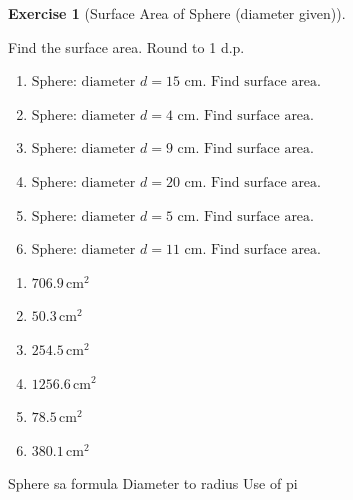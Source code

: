 \documentclass[
  letterpaper,
  DIV=11,
  numbers=noendperiod]{scrreprt}
\theoremstyle{definition}
\newtheorem{exercise}{Exercise}[chapter]
\theoremstyle{remark}
\begin{document}
\begin{exercise}[Surface Area of Sphere (diameter
given)]\protect\hypertarget{exr-cur-12}{}\label{exr-cur-12}

Find the surface area. Round to 1 d.p.

\begin{enumerate}
\def\labelenumi{\alph{enumi})}
\item
  \(\text{Sphere: diameter }d=15\text{ cm. Find surface area.}\)
\item
  \(\text{Sphere: diameter }d=4\text{ cm. Find surface area.}\)
\item
  \(\text{Sphere: diameter }d=9\text{ cm. Find surface area.}\)
\item
  \(\text{Sphere: diameter }d=20\text{ cm. Find surface area.}\)
\item
  \(\text{Sphere: diameter }d=5\text{ cm. Find surface area.}\)
\item
  \(\text{Sphere: diameter }d=11\text{ cm. Find surface area.}\)
\end{enumerate}

\begin{tcolorbox}[enhanced jigsaw, opacitybacktitle=0.6, coltitle=black, arc=.35mm, colframe=quarto-callout-tip-color-frame, colback=white, bottomrule=.15mm, left=2mm, colbacktitle=quarto-callout-tip-color!10!white, titlerule=0mm, opacityback=0, title=\textcolor{quarto-callout-tip-color}{\faLightbulb}\hspace{0.5em}{🔍 View Solution}, leftrule=.75mm, breakable, rightrule=.15mm, bottomtitle=1mm, toptitle=1mm, toprule=.15mm]

\begin{enumerate}
\def\labelenumi{\alph{enumi})}
\item
  \(706.9\,\text{cm}^{2}\)
\item
  \(50.3\,\text{cm}^{2}\)
\item
  \(254.5\,\text{cm}^{2}\)
\item
  \(1256.6\,\text{cm}^{2}\)
\item
  \(78.5\,\text{cm}^{2}\)
\item
  \(380.1\,\text{cm}^{2}\)
\end{enumerate}

\end{tcolorbox}

{Sphere sa formula} {Diameter to radius} {Use of pi}

\end{exercise}
\end{document}
